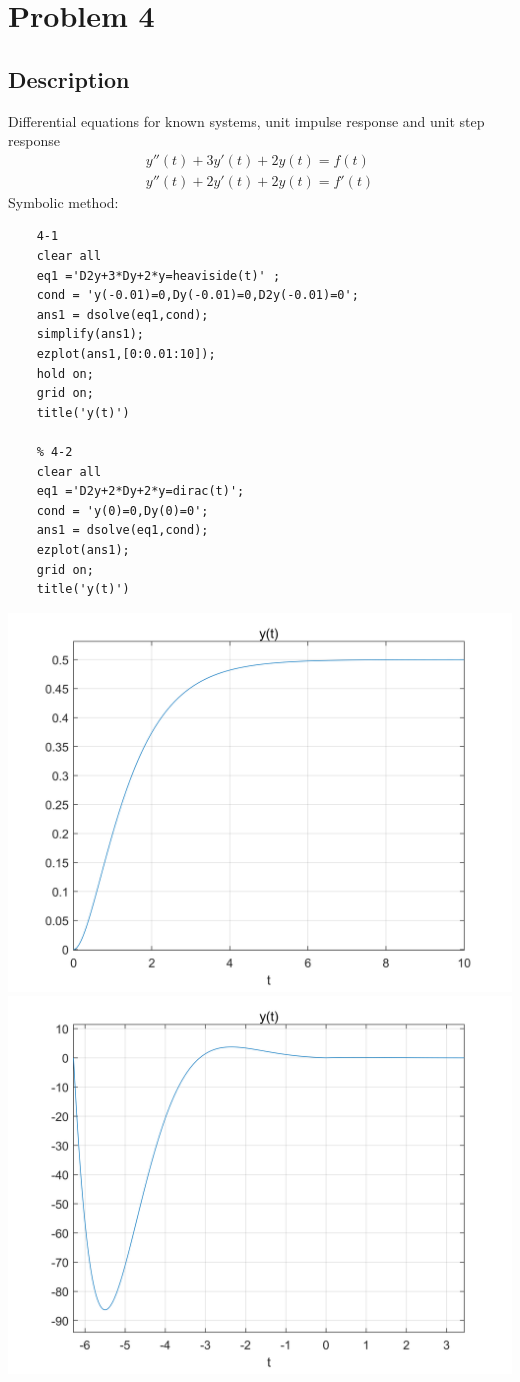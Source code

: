 \documentclass[UTF8,a4paper]{article}
\begin{document}
\section{Problem 4}
\subsection{Description}
Differential equations for known systems, unit impulse response and unit step response
$$
\begin{aligned}
y''(t)+3y'(t)+2y(t)=f(t)\\
y''(t)+2y'(t)+2y(t)=f'(t)
\end{aligned}
$$
Symbolic method:\\
\begin{lstlisting}
	4-1
	clear all
	eq1 ='D2y+3*Dy+2*y=heaviside(t)' ;
	cond = 'y(-0.01)=0,Dy(-0.01)=0,D2y(-0.01)=0';
	ans1 = dsolve(eq1,cond); 
	simplify(ans1);
	ezplot(ans1,[0:0.01:10]);
	hold on;
	grid on;
	title('y(t)')
	
	% 4-2
	clear all
	eq1 ='D2y+2*Dy+2*y=dirac(t)';
	cond = 'y(0)=0,Dy(0)=0';
	ans1 = dsolve(eq1,cond);
	ezplot(ans1);
	grid on;
	title('y(t)')
\end{lstlisting}
\includegraphics[scale=1]{符号法/4-1.png}\\
\includegraphics[scale=1]{符号法/4-2.png}\\
\end{document}

